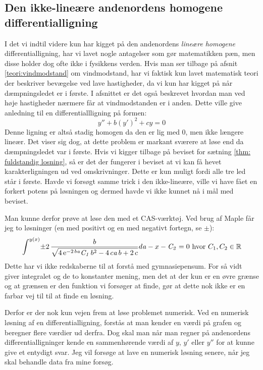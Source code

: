 \subsection{Den ikke-lineære andenordens homogene differentialligning}
I det vi indtil videre kun har kigget på den andenordens \textit{lineære} \textit{homogene} differentialligning, har vi lavet nogle antagelser som gør matematikken pæn, men disse holder dog ofte ikke i fysikkens verden.
Hvis man ser tilbage på afsnit \ref{teori:vindmodstand} om vindmodstand, har vi faktisk kun lavet matematisk teori der beskriver bevægelse ved lave hastigheder, da vi kun har kigget på når dæmpningsledet er i første. 
I afsnittet er det også beskrevet hvordan man ved høje hastigheder nærmere får at vindmodstanden er i anden.
Dette ville give anledning til en differentiallligning på formen:
$$y'' + b(y')^2 + cy = 0$$
Denne ligning er altså stadig homogen da den er lig med $0$, men ikke længere lineær. 
Det viser sig dog, at dette problem er markant sværere at løse end da dæmpningsledet var i første. 
Hvis vi kigger tilbage på beviset for sætning \ref{thm: fuldstandig losning}, så er det der fungerer i beviset at vi kan få hevet karakterligningen ud ved omskrivninger. 
Dette er kun muligt fordi alle tre led står i første. 
Havde vi forsøgt samme trick i den ikke-lineære, ville vi have fået en forkert potens på løsningen og dermed havde vi ikke kunnet nå i mål med beviset. 

Man kunne derfor prøve at løse den med et CAS-værktøj. 
Ved brug af Maple får jeg to løsninger (en med positivt og en med negativt fortegn, se $\pm$):
$$\int ^{y \left( x \right) }\!\pm 2\,{\frac {b}{\sqrt {4\,{{\rm e}^{-2\,b{
\it a}}}{\it C_1}\,{b}^{2}-4\,c{\it a}\,b+2\,c}}}{d{\it a}}-x-{
\it C_2}=0 \text{ hvor } C_1,C_2 \in \mathbb{R}
$$
Dette har vi ikke redskaberne til at forstå med gymnasiepensum. 
For så vidt giver integralet og de to konstanter mening, men det at der kun er en øvre grænse og at grænsen er den funktion vi forsøger at finde, gør at dette nok ikke er en farbar vej til til at finde en løsning. 

Derfor er der nok kun vejen frem at løse problemet numerisk. 
Ved en numerisk løsning af en differentialligning, forstås at man kender en værdi på grafen og beregner flere værdier ud derfra.
Dog skal man når man regner på andenordens differentialligninger kende en sammenhørende værdi af $y$, $y'$ eller $y''$ for at kunne give et entydigt svar.
Jeg vil forsøge at lave en numerisk løsning senere, når jeg skal behandle data fra mine forsøg. 
